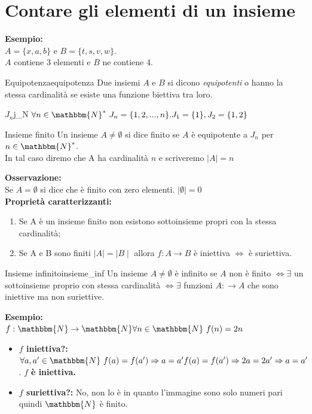 \documentclass[12pt, letterpaper]{report}
\newcounter{definition}
\newcommand{\nmu}{}
\begin{document}
		\chapter{Contare gli elementi di un insieme}
		\textbf{Esempio: }
		\\
		$A = \{x, a, b\}$ e $B = \{t, s, v, w\}$.
		\\
		$A$ contiene 3 elementi e $B$ ne contiene 4.
		\begin{definition}{\nmu Equipotenza}{equipotenza}
		Due insiemi $A$ e $B$ si dicono \textit{equipotenti} o hanno la stessa cardinalità se esiste una funzione biettiva tra loro.
		\end{definition}
		\begin{definition}{\nmu $J_n$}{j_N}
			$\forall n \in \mathbbm{N}^* \ J_n = \{1, 2, ..., n\}. \\ J_1 = \{1\}, J_2 = \{1, 2\}$
		\end{definition}
		\begin{definition}{\nmu Insieme finito}
			Un insieme $A \neq \emptyset$ si dice finito se $A$ è equipotente a $J_n$ per $n \in \mathbbm{N}^*$. \\ In tal caso diremo che A ha cardinalità $n$ e scriveremo $\mid A \mid = n$
		\end{definition}
		\textbf{Osservazione: }
		\\
		Se $A = \emptyset$ si dice che è finito con zero elementi. $\mid \emptyset \mid = 0$
		\\
		\textbf{Proprietà caratterizzanti:}
		\begin{enumerate}
			\item Se A è un insieme finito non esistono sottoinsieme propri con la stessa cardinalità;
			\item Se A e B sono finiti $\mid A \mid = \mid B \mid$ allora $f: A \to B$ è iniettiva $\iff$ è suriettiva.
		\end{enumerate}
		\begin{definition}{\nmu Insieme infinito}{insieme_inf}
			Un insieme $A \neq \emptyset$ è infinito se $A$ non è finito $\iff \exists $ un sottoinsieme proprio con stessa cardinalità $\iff \exists $ funzioni $A: \to A$ che sono iniettive ma non suriettive.
		\end{definition}
		\textbf{Esempio: }
		\\
		$f: \mathbbm{N} \to \mathbbm{N} \forall n \in \mathbbm{N} \ f(n) = 2n$
		\begin{itemize}
			\item \textbf{$f$ iniettiva?:} $\forall a, a' \in \mathbbm{N} \ f(a) = f(a') \Rightarrow a = a' \\ f(a) = f(a') \Rightarrow 2a = 2a' \Rightarrow a = a'$. $f$ \textbf{è iniettiva.}
			\item \textbf{$f$ suriettiva?:} No, non lo è in quanto l'immagine sono solo numeri pari quindi $\mathbbm{N}$ è finito.
		\end{itemize}
\end{document}
